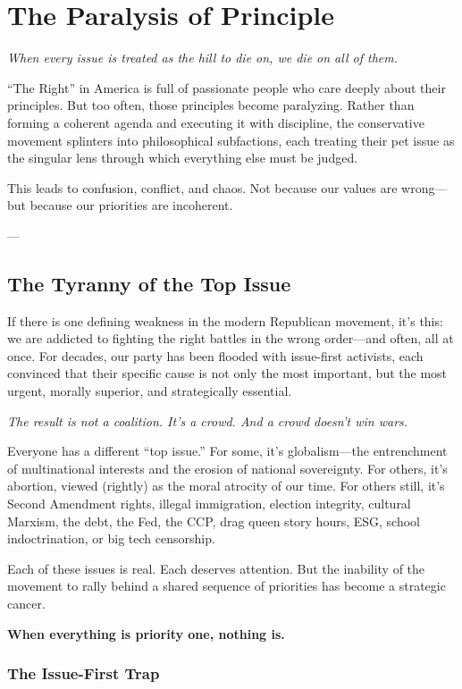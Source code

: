 
\chapter{The Paralysis of Principle}

\textit{When every issue is treated as the hill to die on, we die on all of them.}

``The Right'' in America is full of passionate people who care deeply about their principles. But too often, those principles become paralyzing. Rather than forming a coherent agenda and executing it with discipline, the conservative movement splinters into philosophical subfactions, each treating their pet issue as the singular lens through which everything else must be judged.

This leads to confusion, conflict, and chaos. Not because our values are wrong—but because our priorities are incoherent.

---

\section{The Tyranny of the Top Issue}

If there is one defining weakness in the modern Republican movement, it’s this: we are addicted to fighting the right battles in the wrong order—and often, all at once. For decades, our party has been flooded with issue-first activists, each convinced that their specific cause is not only the most important, but the most urgent, morally superior, and strategically essential.

\textit{The result is not a coalition. It's a crowd. And a crowd doesn't win wars.}

Everyone has a different “top issue.” For some, it’s globalism—the entrenchment of multinational interests and the erosion of national sovereignty. For others, it’s abortion, viewed (rightly) as the moral atrocity of our time. For others still, it's Second Amendment rights, illegal immigration, election integrity, cultural Marxism, the debt, the Fed, the CCP, drag queen story hours, ESG, school indoctrination, or big tech censorship.

Each of these issues is real. Each deserves attention. But the inability of the movement to rally behind a shared sequence of priorities has become a strategic cancer.

\textbf{When everything is priority one, nothing is.}

\subsection*{The Issue-First Trap}

